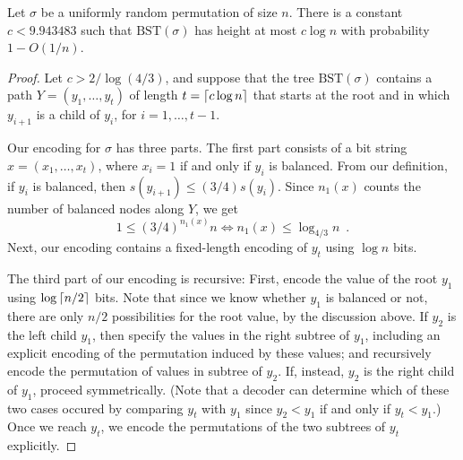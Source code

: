 \documentclass[format=acmsmall, review=false, screen=true]{acmart}
\begin{document}
\begin{thm}
  Let $\sigma$ be a uniformly random permutation of size $n$. 
  There is a constant $c < 9.943483$ such that 
  $\text{BST}(\sigma)$ has height at most $c\log n$ with probability
  $1 - O(1/n)$.
\end{thm}
\begin{proof}
  Let $c > 2/\log (4/3)$,
  and suppose that the tree $\text{BST}(\sigma)$ contains a path
  $Y = (y_1, \ldots, y_t)$ of length $t = {\lceil c \log n \rceil}$ that
  starts at the root and in which $y_{i+1}$ is a child of $y_i$,
  for $i = 1, \dots, t-1$.

  Our encoding for $\sigma$ has three parts. 
  The first part consists of
  a bit string
  $x = (x_1, \dots, x_t)$, where $x_i = 1$ if and only if $y_i$ is
  balanced. From our definition, if $y_i$ is balanced, then
  $s(y_{i + 1}) \leq (3/4) s(y_i)$. Since $n_1(x)$ counts the
  number of balanced nodes along $Y$, we get
  \[
    1 \leq (3/4)^{n_1(x)} n \iff n_1(x) \leq \log_{4/3} n \enspace .
  \]
  Next, our encoding contains a fixed-length encoding of $y_t$ using
  $\log n$ bits.

  The third part of our encoding is recursive: First, encode the value of
  the root $y_1$ using $\log {\lceil n/2 \rceil}$ bits. Note that since we know
  whether $y_1$ is balanced or not, there are only $n/2$ possibilities
  for the root value, by the discussion above.  If $y_2$ is the left child
  $y_1$, then specify the values in the right subtree of $y_1$, including
  an explicit encoding of the permutation induced by these values; and
  recursively encode the permutation of values in subtree of $y_2$. If,
  instead, $y_2$ is the right child of  $y_1$, proceed symmetrically.
  (Note that a decoder can determine which of these two cases occured by
  comparing $y_t$ with $y_1$ since $y_2 <y_1$ if and only if $y_t< y_1$.)
  Once we reach $y_t$, we encode the permutations of the two subtrees
  of $y_t$ explicitly.
 

\end{proof}
\end{document}

